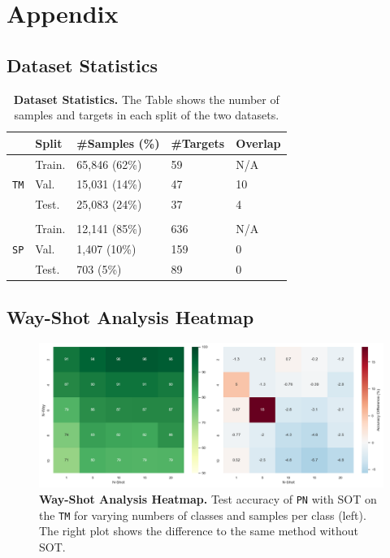 \section{Appendix}

\subsection{Dataset Statistics}

\begin{table}[h]
    \centering
    \caption{\textbf{Dataset Statistics.} The Table shows the number of samples and targets in each split of the two datasets.}
    \vspace{5pt}
    \label{tab:data}
    \begin{tabular}{lllll}
        \toprule
        & \textbf{Split} & \textbf{\#Samples} (\%) & \textbf{\#Targets} & \textbf{Overlap} \\
        \midrule
        \multirow{3}{*}{\texttt{TM}} 
        & Train. & 65,846 (62\%) & 59 & N/A \\
        & Val. & 15,031 (14\%) & 47 & 10 \\
        & Test. & 25,083 (24\%) & 37 & 4 \\
        \\
        \multirow{3}{*}{\texttt{SP}} 
        & Train. & 12,141 (85\%) & 636 & N/A \\
        & Val. & 1,407 (10\%) & 159 & 0 \\
        & Test. & 703 (5\%) & 89 & 0 \\
        \bottomrule
    \end{tabular}
\end{table}

\subsection{Way-Shot Analysis Heatmap}

\begin{figure}[h!]
    \centering
    \includegraphics[width=1\columnwidth]{figures/way-shot-heatmap.png}
    \caption{\textbf{Way-Shot Analysis Heatmap.} Test accuracy of \texttt{PN} with SOT on the \texttt{TM} for varying numbers of classes and samples per class (left). The right plot shows the difference to the same method without SOT.}
    \label{fig:way-shot-heatmap}
\end{figure}
